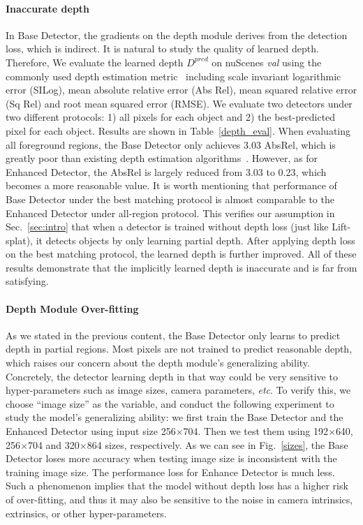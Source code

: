 \documentclass[twocolumn,letterpaper]{article}
\begin{document}
\paragraph{Inaccurate depth} In Base Detector, the gradients on the depth module derives from the detection loss, which is indirect. It is natural to study the quality of learned depth. Therefore, We evaluate the learned depth $D^{pred}$ on nuScenes \emph{val} using the commonly used depth estimation metric~\cite{deptheval} including scale invariant logarithmic error (SILog), mean absolute relative error (Abs Rel), mean squared relative error (Sq Rel) and root mean squared error (RMSE). We evaluate two detectors under two different protocols: 1) all pixels for each object and 2) the best-predicted pixel for each object. Results are shown in Table~\ref{depth_eval}. When evaluating all foreground regions, the Base Detector only achieves 3.03 AbsRel, which is greatly poor than existing depth estimation algorithms~\cite{li2022depthformer,  bhat2021adabins}. However, as for Enhanced Detector, the AbsRel is largely reduced from 3.03 to 0.23, which becomes a more reasonable value. It is worth mentioning that performance of Base Detector under the best matching protocol is almost comparable to the Enhanced Detector under all-region protocol. This verifies our assumption in Sec.~\ref{sec:intro} that when a detector is trained without depth loss (just like Lift-splat), it detects objects by only learning partial depth. After applying depth loss on the best matching protocol, the learned depth is further improved. All of these results demonstrate that the implicitly learned depth is inaccurate and is far from satisfying.

\paragraph{Depth Module Over-fitting} As we stated in the previous content, the Base Detector only learns to predict depth in partial regions. Most pixels are not trained to predict reasonable depth, which raises our concern about the depth module's generalizing ability. Concretely, the detector learning depth in that way could be very sensitive to hyper-parameters such as image sizes, camera parameters, \emph{etc}. To verify this, we choose ``image size'' as the variable, and conduct the following experiment to study the model's generalizing ability: we first train the Base Detector and the Enhanced Detector using input size 256$\times$704. Then we test them using 192$\times$640, 256$\times$704 and 320$\times$864 sizes, respectively. As we can see in Fig.~\ref{sizes}, the Base Detector loses more accuracy when testing image size is inconsistent with the training image size. The performance loss for Enhance Detector is much less. Such a phenomenon implies that the model without depth loss has a higher risk of over-fitting, and thus it may also be sensitive to the noise in camera intrinsics, extrinsics, or other hyper-parameters. 
\end{document}
